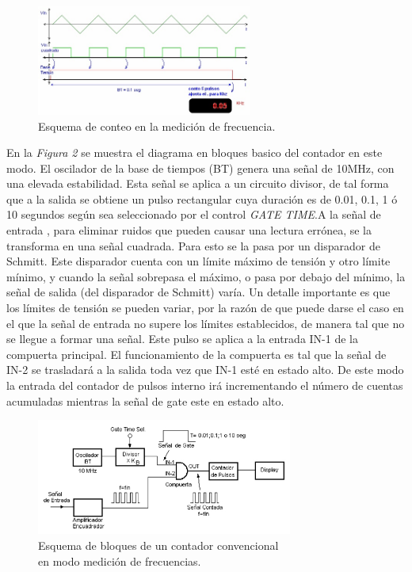 \documentclass{article}
\begin{document}
\begin{figure}[h]
	\centering
	\includegraphics[width=0.63\textwidth]{images/01-ondasFrecuenciaContador.jpg}
	\medskip
	\caption{Esquema de conteo en la medición de frecuencia.}
\end{figure}
\bigskip\bigskip

	
	En la \textit{Figura 2} se muestra el diagrama en bloques basico del contador en este modo. El oscilador de la base de tiempos (BT) genera una señal de 10MHz, con una elevada estabilidad. Esta señal se aplica a un circuito divisor, de tal forma que a la salida se obtiene un pulso rectangular cuya duración es de 0.01, 0.1, 1 ó 10 segundos según sea seleccionado por el control \textit{GATE TIME}.A la señal de entrada , para eliminar ruidos que pueden causar una lectura errónea, se la transforma en una señal cuadrada. Para esto se la pasa por un disparador de Schmitt. Este disparador cuenta con un límite máximo de tensión y otro límite mínimo, y cuando la señal sobrepasa el máximo, o pasa por debajo del mínimo, la señal de salida (del disparador de Schmitt) varía. Un detalle importante es que los límites de tensión se pueden variar, por la razón de que puede darse el caso en el que la señal de entrada no supere los límites establecidos, de manera tal que no se llegue a formar una señal. Este pulso se aplica a la entrada IN-1 de la compuerta principal. El funcionamiento de la compuerta es tal que la señal de IN-2 se trasladará a la salida toda vez que IN-1 esté en estado alto. De este modo la entrada del contador de pulsos interno irá incrementando el número de cuentas acumuladas mientras la señal de gate este en estado alto. 
\bigskip


\newpage
\begin{figure}[h]
	\centering
	\includegraphics[width=0.75\textwidth]{images/02-diagrama-en-bloques-modo-medicion-frecuencia.jpg}
	\medskip
	\caption{Esquema de bloques de un contador convencional\\ en modo medición de frecuencias.}
\end{figure}
\bigskip\bigskip
\end{document}

